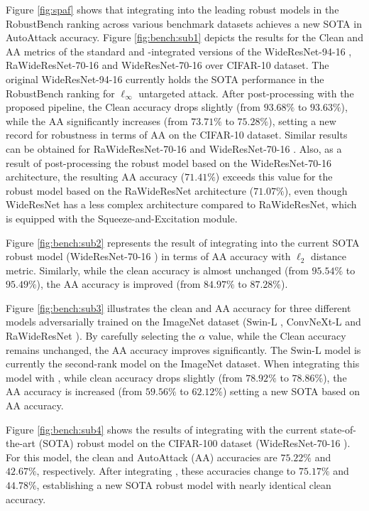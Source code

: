 \documentclass[conference]{IEEEtran}
\begin{document}
Figure \mbox{\ref{fig:spaf}} shows that integrating \sys into the leading  robust models in the RobustBench ranking \mbox{\cite{reoch20}} across various benchmark datasets achieves a new SOTA in AutoAttack accuracy. Figure \mbox{\ref{fig:bench:sub1}} depicts the results for the Clean and AA metrics of the standard and \sys-integrated versions of the WideResNet-94-16 \mbox{\cite{arlbd24}}, RaWideResNet-70-16  \mbox{\cite{rpapx23}} and WideResNet-70-16  \mbox{\cite{bdmwp23}} over CIFAR-10 dataset. The original WideResNet-94-16 \mbox{\cite{arlbd24}} currently holds the SOTA performance in the RobustBench ranking \mbox{\cite{reoch20}} for $\ell_\infty$ untargeted attack. After post-processing with the proposed pipeline, the Clean accuracy drops slightly (from $93.68\%$ to $93.63\%$), while the AA significantly increases (from $73.71\%$ to $75.28\%$), setting a new record for robustness in terms of AA on the CIFAR-10 dataset. Similar results can be obtained for RaWideResNet-70-16  \mbox{\cite{rpapx23}} and WideResNet-70-16  \mbox{\cite{bdmwp23}}. Also, as a result of post-processing the robust model based on the WideResNet-70-16 architecture, the resulting AA accuracy ($71.41\%$) exceeds this value for the robust model based on the RaWideResNet architecture ($71.07\%$), even though WideResNet has a less complex architecture compared to RaWideResNet, which is equipped with the Squeeze-and-Excitation module.

Figure \mbox{\ref{fig:bench:sub2}} represents the result of integrating \sys into the current SOTA robust model (WideResNet-70-16 \mbox{\cite{bdmwp23}}) in terms of AA accuracy with $\ell_2$ distance metric. Similarly, while the clean accuracy is almost unchanged (from $95.54\%$ to $95.49\%$), the AA accuracy is improved (from $84.97\%$ to $87.28\%$).

Figure \mbox{\ref{fig:bench:sub3}} illustrates the clean and AA accuracy for three different models adversarially trained on the ImageNet dataset (Swin-L \mbox{\cite{acsld24}}, ConvNeXt-L  \mbox{\cite{acsld23}} and  RaWideResNet \mbox{\cite{rpapx23}}). By carefully selecting the $\alpha$ value, while the Clean accuracy remains unchanged, the AA accuracy improves significantly. The Swin-L model \mbox{\cite{acsld24}} is currently the second-rank model on the ImageNet dataset. When integrating this model with \sys, while clean accuracy drops slightly (from $78.92\%$ to $78.86\%$), the AA accuracy is increased (from $59.56\%$ to $62.12\%$) setting a new SOTA based on AA accuracy.


Figure \mbox{\ref{fig:bench:sub4}} shows the results of integrating \sys with the current state-of-the-art (SOTA) robust model on the CIFAR-100 dataset (WideResNet-70-16 \mbox{\cite{bdmwp23}}). For this model, the clean and AutoAttack (AA) accuracies are $75.22\%$ and $42.67\%$, respectively. After integrating \sys, these accuracies change to $75.17\%$ and $44.78\%$, establishing a new SOTA robust model with nearly identical clean accuracy.
\end{document}

